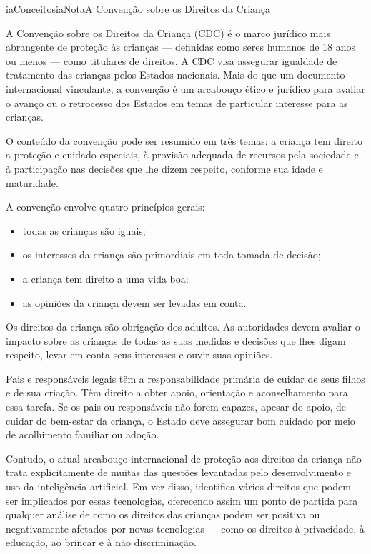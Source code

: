 \documentclass[
  11pt,
]{article}
\providecommand{\tightlist}{%
  \setlength{\itemsep}{0pt}\setlength{\parskip}{0pt}}
\newenvironment{nota}[1][Nota]{\begin{iabox}{iaConceitos}{iaNota}{#1}}{\end{iabox}}
\begin{document}
\begin{nota}[A Convenção sobre os Direitos da Criança]

A Convenção sobre os Direitos da Criança (CDC) é o marco jurídico mais
abrangente de proteção às crianças --- definidas como seres humanos de
18 anos ou menos --- como titulares de direitos. A CDC visa assegurar
igualdade de tratamento das crianças pelos Estados nacionais. Mais do
que um documento internacional vinculante, a convenção é um arcabouço
ético e jurídico para avaliar o avanço ou o retrocesso dos Estados em
temas de particular interesse para as crianças.

O conteúdo da convenção pode ser resumido em três temas: a criança tem
direito a proteção e cuidado especiais, à provisão adequada de recursos
pela sociedade e à participação nas decisões que lhe dizem respeito,
conforme sua idade e maturidade.

A convenção envolve quatro princípios gerais:

\begin{itemize}
\tightlist
\item
  todas as crianças são iguais;
\item
  os interesses da criança são primordiais em toda tomada de decisão;
\item
  a criança tem direito a uma vida boa;
\item
  as opiniões da criança devem ser levadas em conta.
\end{itemize}

Os direitos da criança são obrigação dos adultos. As autoridades devem
avaliar o impacto sobre as crianças de todas as suas medidas e decisões
que lhes digam respeito, levar em conta seus interesses e ouvir suas
opiniões.

Pais e responsáveis legais têm a responsabilidade primária de cuidar de
seus filhos e de sua criação. Têm direito a obter apoio, orientação e
aconselhamento para essa tarefa. Se os pais ou responsáveis não forem
capazes, apesar do apoio, de cuidar do bem-estar da criança, o Estado
deve assegurar bom cuidado por meio de acolhimento familiar ou adoção.

\end{nota}

Contudo, o atual arcabouço internacional de proteção aos direitos da
criança não trata explicitamente de muitas das questões levantadas pelo
desenvolvimento e uso da inteligência artificial. Em vez disso,
identifica vários direitos que podem ser implicados por essas
tecnologias, oferecendo assim um ponto de partida para qualquer análise
de como os direitos das crianças podem ser positiva ou negativamente
afetados por novas tecnologias --- como os direitos à privacidade, à
educação, ao brincar e à não discriminação.
\end{document}
